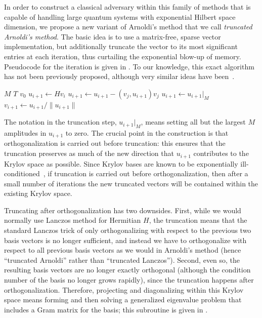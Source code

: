 \documentclass[
  reprint,            %
  amsmath,amssymb,
  aps,
  superscriptaddress, %
  longbibliography
]{revtex4-2}
\theoremstyle{definition}
\begin{document}
\begin{itemize}
In order to construct a classical adversary within this family of methods that is capable of handling large quantum systems with exponential Hilbert space dimension, we propose a new variant of Arnoldi's method that we call \emph{truncated Arnoldi's method}.
The basic idea is to use a matrix-free, sparse vector implementation, but additionally truncate the vector to its most significant entries at each iteration, thus curtailing the exponential blow-up of memory.
Pseudocode for the iteration is given in .
To our knowledge, this exact algorithm has not been previously proposed, although very similar ideas have been~\cite{moro1981calculation,kuprov2008polynomially,ma2013sparse}.

\begin{algorithm}[H]
\caption{Truncated Arnoldi iteration}\label{alg:tr_arn_iter}
\begin{algorithmic}[1]
    \Require $M$ 
    \Require $T$ 
    \Require $v_0$ 
        \State $u_{i+1}\gets Hv_i$ 
            \State $u_{i+1}\gets u_{i+1} - (v_j, u_{i+1})v_j$ 
        \EndFor
        \State $u_{i+1}\gets u_{i+1}|_M$ 
        \State $v_{i+1}\gets u_{i+1}/\|u_{i+1}\|$ 
    \EndFor
\end{algorithmic}
\end{algorithm}

The notation in the truncation step, $u_{i+1}|_M$, means setting all but the largest $M$ amplitudes in $u_{i+1}$ to zero.
The crucial point in the construction is that orthogonalization is carried out before truncation: this ensures that the truncation preserves as much of the new direction that $u_{i+1}$ contributes to the Krylov space as possible.
Since Krylov bases are known to be exponentially ill-conditioned~\cite{beckerman2017singularvalues}, if truncation is carried out before orthogonalization, then after a small number of iterations the new truncated vectors will be contained within the existing Krylov space.

Truncating after orthogonalization has two downsides.
First, while we would normally use Lanczos method for Hermitian $H$, the truncation means that the standard Lanczos trick of only orthogonalizing with respect to the previous two basis vectors is no longer sufficient, and instead we have to orthogonalize with respect to all previous basis vectors as we would in Arnoldi's method (hence ``truncated Arnoldi'' rather than ``truncated Lanczos'').
Second, even so, the resulting basis vectors are no longer exactly orthogonal (although the condition number of the basis no longer grows rapidly), since the truncation happens after orthogonalization.
Therefore, projecting and diagonalizing within this Krylov space means forming and then solving a generalized eigenvalue problem that includes a Gram matrix for the basis; this subroutine is given in .


\end{itemize}
\end{document}
